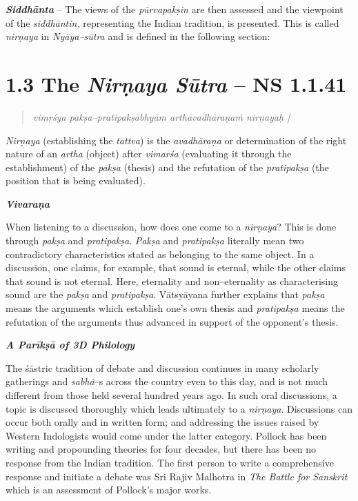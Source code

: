 \textit{\textbf{Siddhānta}} – The views of the \textit{pūrvapakṣin} are then assessed and the viewpoint of the \textit{siddhāntin,} representing the Indian tradition, is presented. This is called \textit{nirṇaya} in \textit{Nyāya–sūtra} and is defined in the following section:


\section*{1.3 The {\it {\bfseries Nirṇaya Sūtra}} – NS 1.1.41}

\begin{verse}
\textit{vimṛśya pakṣa–pratipakṣābhyām arthāvadhāraṇaṁ nirṇayaḥ |}
\end{verse}

\textit{Nirṇaya} (establishing the \textit{tattva}) is the \textit{avadhāraṇa} or determination of the right nature of an \textit{artha} (object) after \textit{vimarśa} (evaluating it through the establishment) of the \textit{pakṣa} (thesis) and the refutation of the \textit{pratipakṣa} (the position that is being evaluated).

\textit{\textbf{Vivaraṇa}}

When listening to a discussion, how does one come to a \textit{nirṇaya}? This is done through \textit{pakṣa} and \textit{pratipakṣa}. \textit{Pakṣa} and \textit{pratipakṣa} literally mean two contradictory characteristics stated as belonging to the same object. In a discussion, one claims, for example, that sound is eternal, while the other claims that sound is not eternal. Here, eternality and non–eternality as characterising sound are the \textit{pakṣa} and \textit{pratipakṣa}. Vātsyāyana further explains that \textit{pakṣa} means the arguments which establish one's own thesis and \textit{pratipakṣa} means the refutation of the arguments thus advanced in support of the opponent's thesis.

\textbf{\textit{A Parīkṣā of 3D Philology}}

The śāstric tradition of debate and discussion continues in many scholarly gatherings and \textit{sabhā}–s across the country even to this day, and is not much different from those held several hundred years ago. In such oral discussions, a topic is discussed thoroughly which leads ultimately to a \textit{nirṇaya}. Discussions can occur both orally and in written form; and addressing the issues raised by Western Indologists would come under the latter category. Pollock has been writing and propounding theories for four decades, but there has been no response from the Indian tradition. The first person to write a comprehensive response and initiate a debate was Sri Rajiv Malhotra in \textit{The Battle for Sanskrit }which is an assessment of Pollock’s major works.

